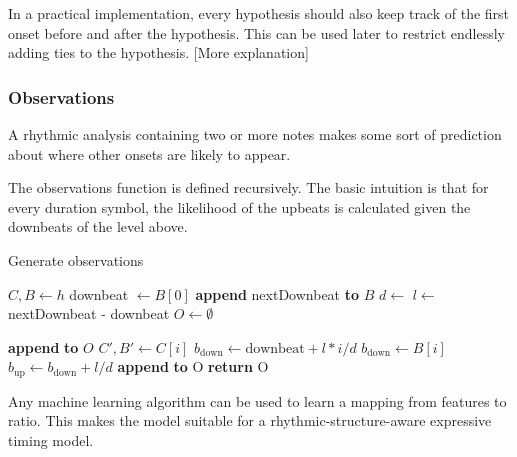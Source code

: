 In a practical implementation, every hypothesis should also keep track of the first onset before and after the hypothesis. This can be used later to restrict endlessly adding ties to the hypothesis. [More explanation]

\subsubsection{Observations}


A rhythmic analysis containing two or more notes makes some sort of prediction about where other onsets are likely to appear. 

The observations function is defined recursively. The basic intuition is that for every duration symbol, the likelihood of the upbeats is calculated given the downbeats of the level above. 

\begin{algorithm}
\caption{Generate observations}
\label{alg:observations}
\begin{algorithmic}
	\State $C, B \leftarrow h$
		\State downbeat $\leftarrow B[0]$
	\EndIf
	\State \textbf{append} nextDownbeat \textbf{to} $B$
	\State $d \leftarrow$ 
	\State $l \leftarrow$ nextDownbeat - downbeat
	\State $O \leftarrow \emptyset$

			\State \textbf{append}  \textbf{to} $O$
		\EndIf	
		\State $C', B' \leftarrow C[i]$
			\State $b_{\mathrm{down}} \leftarrow \mathrm{downbeat} + l * i/d$
				\State $b_{\mathrm{down}} \leftarrow B[i]$
			\EndIf
			\State $b_{\mathrm{up}} \leftarrow b_{\mathrm{down}} + l/d$
			\State \textbf{append}  \textbf{to} O
		\EndIf
	\EndFor
	\State \textbf{return} O
\EndFunction
\end{algorithmic}
\end{algorithm}

Any machine learning algorithm can be used to learn a mapping from features to ratio. This makes the model suitable for a rhythmic-structure-aware expressive timing model.


